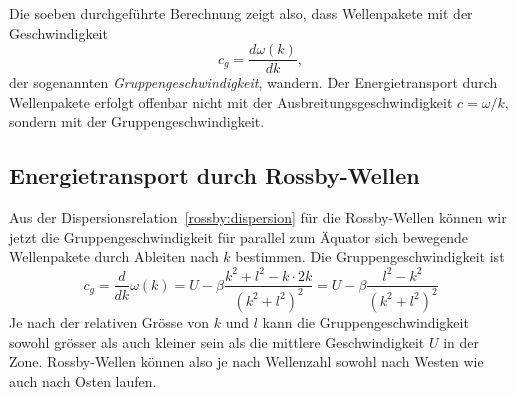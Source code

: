 Die soeben durchgeführte Berechnung zeigt also, dass Wellenpakete
mit der Geschwindigkeit 
\[
c_g=\frac{d\omega(k)}{dk},
\]
der sogenannten {\em Gruppengeschwindigkeit}, wandern.
%
Der Energietransport durch Wellenpakete erfolgt offenbar nicht
mit der Ausbreitungsgeschwindigkeit $c=\omega/k$, sondern mit der
Gruppengeschwindigkeit.

\subsection{Energietransport durch Rossby-Wellen\label{rossby:transport}}
Aus der Dispersionsrelation~\eqref{rossby:dispersion}
für die Rossby-Wellen können wir jetzt die Gruppengeschwindigkeit
für parallel zum Äquator sich bewegende Wellenpakete
durch Ableiten nach $k$ bestimmen.
Die Gruppengeschwindigkeit ist
\begin{equation}
c_g
=
\frac{d}{dk}\omega(k)
=
U-\beta
\frac{k^2+l^2-k\cdot 2k}{(k^2+l^2)^2}
=
U-\beta
\frac{l^2-k^2}{(k^2+l^2)^2}
\end{equation}
Je nach der relativen Grösse von $k$ und $l$ kann die
Gruppengeschwindigkeit sowohl grösser als auch kleiner sein als die
mittlere Geschwindigkeit $U$ in der Zone.
Rossby-Wellen können also je nach Wellenzahl sowohl nach Westen wie
auch nach Osten laufen.







